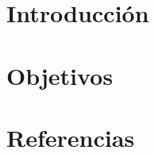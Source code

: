 \documentclass[titlepage,openany,twoside,a4paper,12pt,spanish]{book}
\begin{document}




\tableofcontents

\listoffigures

\chapter{Introducción} %


\chapter{Objetivos}


\chapter*{Referencias}

\end{document}
